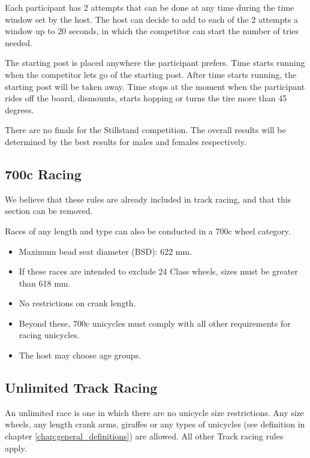 Each participant has 2 attempts that can be done at any time during the time window set by the host.
The host can decide to add to each of the 2 attempts a window up to 20 seconds, in which the competitor can start the number of tries needed.

The starting post is placed anywhere the participant prefers.
Time starts running when the competitor lets go of the starting post.
After time starts running, the starting post will be taken away.
Time stops at the moment when the participant rides off the board, dismounts, starts hopping or turns the tire more than 45 degrees.

There are no finals for the Stillstand competition.
The overall results will be determined by the best results for males and females respectively.

\subsection{700c Racing}

\begin{comment2016}
We believe that these rules are already included in track racing, and that this section can be removed.
\end{comment2016}


Races of any length and type can also be conducted in a 700c wheel category.
\begin{itemize}
\item Maximum bead seat diameter (BSD): 622 mm.
\item If these races are intended to exclude 24 Class wheels, sizes must be greater than 618 mm.
\item No restrictions on crank length.
\item Beyond these, 700c unicycles must comply with all other requirements for racing unicycles.
\item The host may choose age groups.
\end{itemize}

\subsection{Unlimited Track Racing}

An unlimited race is one in which there are no unicycle size restrictions.
Any size wheels, any length crank arms, giraffes or any types of unicycles (see definition in chapter \ref{chap:general_definitions}) are allowed.
All other Track racing rules apply.

